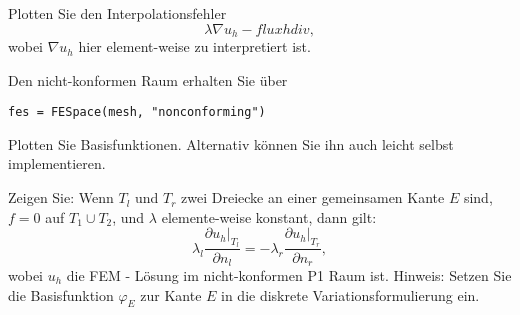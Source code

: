 \documentclass[11pt,a4paper]{report}
\begin{document}
\begin{enumerate}
  Plotten Sie den Interpolationsfehler
  $$
  \lambda \nabla u_h - fluxhdiv,
  $$
  wobei $\nabla u_h$ hier element-weise zu  interpretiert ist.
  
  Den nicht-konformen Raum erhalten Sie \"uber 
\begin{verbatim}
fes = FESpace(mesh, "nonconforming")
\end{verbatim}
 Plotten Sie Basisfunktionen. Alternativ k\"onnen Sie ihn auch leicht selbst implementieren.


  Zeigen Sie: Wenn $T_l$ und $T_r$ zwei Dreiecke an einer gemeinsamen
  Kante $E$ sind, $f = 0$ auf $T_1 \cup T_2$, und $\lambda$
  elemente-weise konstant, dann gilt:
  $$
  \lambda_l \frac{\partial u_h|_{T_l}}{\partial n_l} =
  -\lambda_r \frac{\partial u_h|_{T_r}}{\partial n_r},
  $$
  wobei $u_h$ die FEM - L\"osung im nicht-konformen P1 Raum ist.
  Hinweis: Setzen Sie die Basisfunktion $\varphi_E$ zur Kante $E$ in die diskrete
  Variationsformulierung ein.

\end{enumerate}
\end{document}
